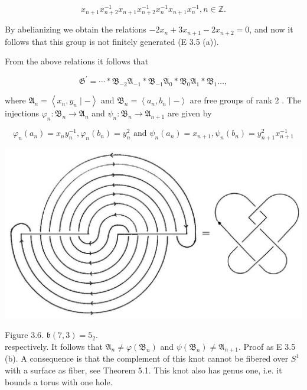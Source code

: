 \documentclass[10pt, letterpaper]{article}
\begin{document}
$$
x_{n+1} x_{n+2}^{-1} x_{n+1} x_{n+2}^{-1} x_{n}^{-1} x_{n+1} x_{n}^{-1}, n \in \mathbb{Z} .
$$

By abelianizing we obtain the relations $-2 x_{n}+3 x_{n+1}-2 x_{n+2}=0$, and now it follows that this group is not finitely generated (E 3.5 (a)).

From the above relations it follows that

$$
\mathfrak{G}^{\prime}=\cdots * \mathfrak{B}_{-2} \mathfrak{A}_{-1} * \mathfrak{B}_{-1} \mathfrak{A}_{0} * \mathfrak{B}_{0} \mathfrak{A}_{1} * \mathfrak{B}_{1} \ldots,
$$

where $\mathfrak{A}_{n}=\left\langle x_{n}, y_{n} \mid-\right\rangle$ and $\mathfrak{B}_{n}=\left\langle a_{n}, b_{n} \mid-\right\rangle$ are free groups of rank 2 . The injections $\varphi_{n}: \mathfrak{B}_{n} \rightarrow \mathfrak{A}_{n}$ and $\psi_{n}: \mathfrak{B}_{n} \rightarrow \mathfrak{A}_{n+1}$ are given by

$$
\varphi_{n}\left(a_{n}\right)=x_{n} y_{n}^{-1}, \varphi_{n}\left(b_{n}\right)=y_{n}^{2} \text { and } \psi_{n}\left(a_{n}\right)=x_{n+1}, \psi_{n}\left(b_{n}\right)=y_{n+1}^{2} x_{n+1}^{-1}
$$

\begin{center}
\includegraphics[scale=0.2]{2025_05_21_9c06be8de7a55410f8c1g-052}
\end{center}

Figure 3.6. $\mathfrak{b}(7,3)=5_{2}$.\\
respectively. It follows that $\mathfrak{A}_{n} \neq \varphi\left(\mathfrak{B}_{n}\right)$ and $\psi\left(\mathfrak{B}_{n}\right) \neq \mathfrak{A}_{n+1}$. Proof as E 3.5 (b). A consequence is that the complement of this knot cannot be fibered over $S^{1}$ with a surface as fiber, see Theorem 5.1. This knot also has genus one, i.e. it bounds a torus with one hole.
\end{document}
